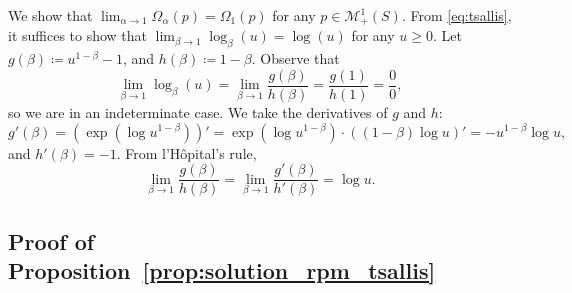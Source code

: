\documentclass{article}
\begin{document}
We show that $\lim_{\alpha \rightarrow 1} \Omega_{\alpha}(p) = \Omega_1(p)$ for any $p\in \mathcal{M}_+^1(S)$. 
From \eqref{eq:tsallis}, it suffices to show that $\lim_{\beta\rightarrow 1} \log_\beta (u) = \log(u)$ for any $u \ge 0$. 
Let $g(\beta) \coloneqq u^{1-\beta} - 1$, and
$h(\beta)\coloneqq 1 - \beta$. Observe that $$\lim_{\beta\rightarrow 1}\log_\beta (u) = \lim_{\beta\rightarrow 1} \frac{g(\beta)}{h(\beta)} =
\frac{g(1)}{h(1)}
= \frac{0}{0},$$
so we are in an indeterminate case.
We take the derivatives of $g$ and $h$: 
\begin{equation}
g'(\beta) = \left(\exp (\log u^{1-\beta}) \right)'
= \exp (\log u^{1-\beta}) \cdot ((1-\beta) \log u)'
= -u^{1-\beta} \log u,
\end{equation}
and $h'(\beta) = -1$. 
From l'H\^{o}pital's rule,
\begin{equation}
\lim_{\beta \rightarrow 1} \frac{g(\beta)}{h(\beta)}
=\lim_{\beta \rightarrow 1} \frac{g'(\beta)}{h'(\beta)}
= \log u.
\end{equation}


\subsection{Proof of Proposition~\ref{prop:solution_rpm_tsallis}}
\end{document}
